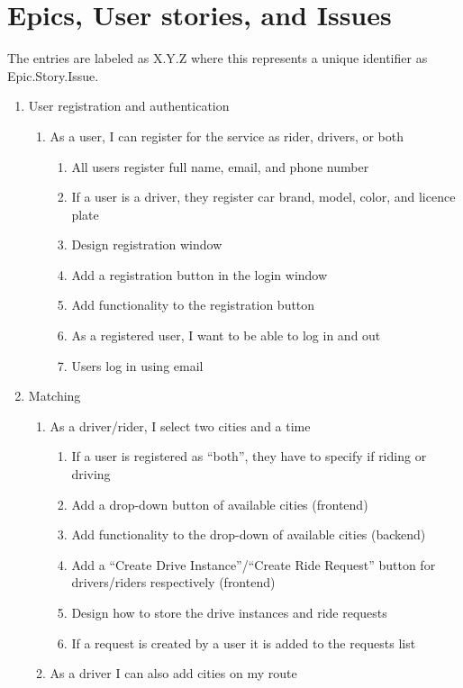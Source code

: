 \documentclass{article}
\begin{document}
\section{Epics, User stories, and Issues}
The entries are labeled as X.Y.Z where this represents a unique identifier as Epic.Story.Issue.
\begin{enumerate}
  
  \item User registration and authentication
  \begin{enumerate}
    \item As a user, I can register for the service as rider, drivers, or both
    \begin{enumerate}
        \item All users register full name, email, and phone number
        \item If a user is a driver, they register car brand, model, color, and licence plate
        \item Design registration window
        \item Add a registration button in the login window
        \item Add functionality to the registration button
        \item As a registered user, I want to be able to log in and out
        \item Users log in using email
    \end{enumerate}
  \end{enumerate}
  
  \item Matching
  \begin{enumerate}
      \item As a driver/rider, I select two cities and a time
      \begin{enumerate}
          \item If a user is registered as “both”, they have to specify if riding or driving
          \item Add a drop-down button of available cities (frontend)
          \item Add functionality to the drop-down of available cities (backend)
          \item Add a “Create Drive Instance”/“Create Ride Request” button for drivers/riders respectively (frontend)
          \item Design how to store the drive instances and ride requests
          \item If a request is created by a user it is added to the requests list
      \end{enumerate}
      \item As a driver I can also add cities on my route
  \end{enumerate}
  

\end{enumerate}
\end{document}
